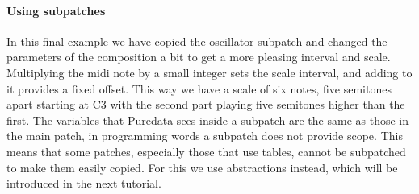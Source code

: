 \paragraph{Using subpatches}
In this final example we have copied the oscillator subpatch and changed
the parameters of the composition a bit to get a more pleasing interval
and scale. Multiplying the midi note by a small integer sets the scale
interval, and adding to it provides a fixed offset. This way we have a scale
of six notes, five semitones apart starting at C3 with the second part playing
five semitones higher than the first. The variables that Puredata sees inside
a subpatch are the same as those in the main patch, in programming words a subpatch
does not provide scope. This means that some patches, especially those that use
tables, cannot be subpatched to make them easily copied. For this we use
abstractions instead, which will be introduced in the next tutorial.

